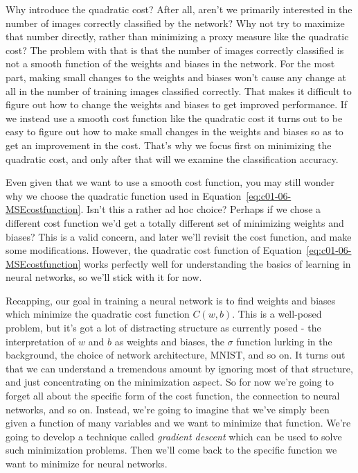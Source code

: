 Why introduce the quadratic cost? After all, aren't we primarily interested in the number of images correctly classified by the network? Why not try to maximize that number directly, rather than minimizing a proxy measure like the quadratic cost? The problem with that is that the number of images correctly classified is not a smooth function of the weights and biases in the network. For the most part, making small changes to the weights and biases won't cause any change at all in the number of training images classified correctly. That makes it difficult to figure out how to change the weights and biases to get improved performance. If we instead use a smooth cost function like the quadratic cost it turns out to be easy to figure out how to make small changes in the weights and biases so as to get an improvement in the cost. That's why we focus first on minimizing the quadratic cost, and only after that will we examine the classification accuracy.

Even given that we want to use a smooth cost function, you may still wonder why we choose the quadratic function used in Equation~\ref{eq:c01-06-MSEcostfunction}. Isn't this a rather ad hoc choice? Perhaps if we chose a different cost function we'd get a totally different set of minimizing weights and biases? This is a valid concern, and later we'll revisit the cost function, and make some modifications. However, the quadratic cost function of Equation~\ref{eq:c01-06-MSEcostfunction} works perfectly well for understanding the basics of learning in neural networks, so we'll stick with it for now.

Recapping, our goal in training a neural network is to find weights and biases which minimize the quadratic cost function $C(w,b)$. This is a well-posed problem, but it's got a lot of distracting structure as currently posed - the interpretation of $w$ and $b$ as weights and biases, the $\sigma$ function lurking in the background, the choice of network architecture, MNIST, and so on. It turns out that we can understand a tremendous amount by ignoring most of that structure, and just concentrating on the minimization aspect. So for now we're going to forget all about the specific form of the cost function, the connection to neural networks, and so on. Instead, we're going to imagine that we've simply been given a function of many variables and we want to minimize that function. We're going to develop a technique called \textit{gradient descent} which can be used to solve such minimization problems. Then we'll come back to the specific function we want to minimize for neural networks.

